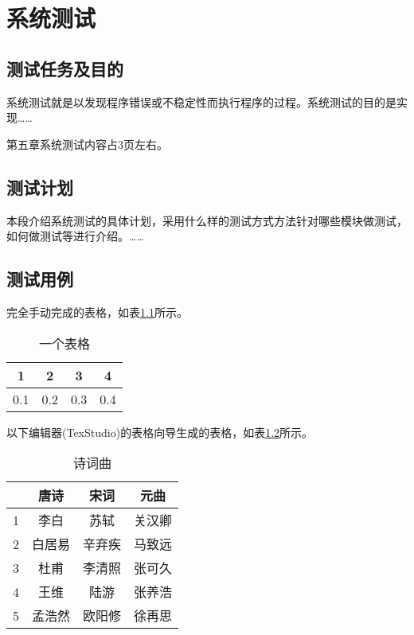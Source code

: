 

\chapter{系统测试}

\section{测试任务及目的}
系统测试就是以发现程序错误或不稳定性而执行程序的过程。系统测试的目的是实现……

第五章系统测试内容占3页左右。


\section{测试计划}
本段介绍系统测试的具体计划，采用什么样的测试方式方法针对哪些模块做测试，如何做测试等进行介绍。……

\section{测试用例}
完全手动完成的表格，如表\ref{tab:tab1}所示。
\begin{table}[htbp] %
	\centering  %
	\caption{一个表格}  %
	\label{tab:tab1}  %
	\begin{tabular}{|c|c|c|c|}   
		\hline  %
		1 & 2 & 3 & 4 \\  %
		\hline 
		0.1 & 0.2 & 0.3 & 0.4 \\
		\hline
	\end{tabular}
\end{table}

以下编辑器(TexStudio)的表格向导生成的表格，如表\ref{tab:tab2}所示。
\begin{table}[htbp]
	\centering  
	\caption{诗词曲}   
    \label{tab:tab2}  
    \begin{tabular}{|c|c|c|c|}
        \hline 
          & 唐诗 & 宋词 & 元曲 \\ 
        \hline 
        1 & 李白 & 苏轼 & 关汉卿 \\ 
        \hline 
        2 & 白居易 & 辛弃疾 & 马致远 \\ 
        \hline 
        3 & 杜甫 & 李清照 & 张可久 \\ 
        \hline 
        4 & 王维 & 陆游 & 张养浩 \\ 
        \hline 
        5 & 孟浩然 & 欧阳修 & 徐再思 \\ 
        \hline 
    \end{tabular}  
\end{table}

